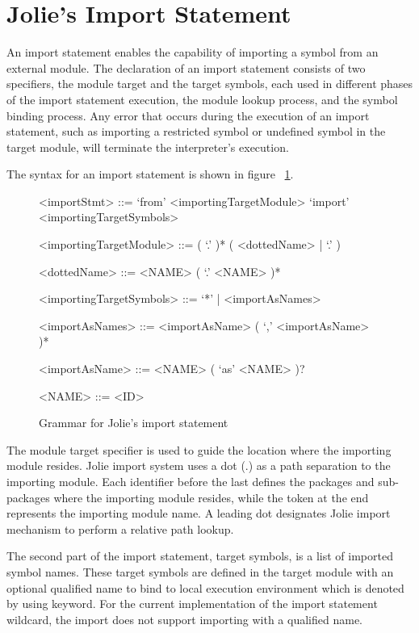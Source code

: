 
\section{Jolie's Import Statement}

An import statement enables the capability of importing a symbol from an external module. The declaration of an import statement consists of two specifiers, the module target and the target symbols, each used in different phases of the import statement execution, the module lookup process, and the symbol binding process. Any error that occurs during the execution of an import statement, such as importing a restricted symbol or undefined symbol in the target module, will terminate the interpreter's execution.

The syntax for an import statement is shown in figure ~\ref{fig:jolie-import-stmt-syntax}.

\begin{figure}[ht]
    \begin{framed}
        \begin{grammar}
            <importStmt>
            ::= `from' <importingTargetModule> `import' <importingTargetSymbols>

            <importingTargetModule> ::= ( `.' )* ( <dottedName> | `.' )

            <dottedName>
            ::= <NAME> ( `.' <NAME> )*

            <importingTargetSymbols> ::=  `*' | <importAsNames>

            <importAsNames>
            ::= <importAsName> ( `,' <importAsName> )*

            <importAsName>
            ::= <NAME> ( `as' <NAME> )?

            <NAME> ::= <ID>
        \end{grammar}
    \end{framed}
    \caption{Grammar for Jolie's import statement}
    \label{fig:jolie-import-stmt-syntax}
\end{figure}

The module target specifier is used to guide the location where the importing module resides. Jolie import system uses a dot (.) as a path separation to the importing module. Each identifier before the last defines the packages and sub-packages where the importing module resides, while the token at the end represents the importing module name. A leading dot designates Jolie import mechanism to perform a relative path lookup.

The second part of the import statement, target symbols, is a list of imported symbol names. These target symbols are defined in the target module with an optional qualified name to bind to local execution environment which is denoted by using  keyword. For the current implementation of the import statement wildcard, the import does not support importing with a qualified name.